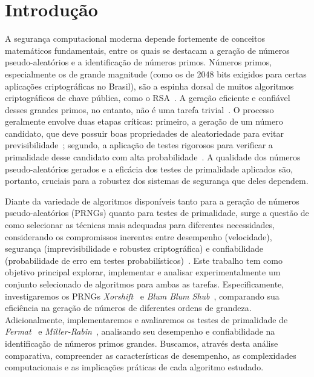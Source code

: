 \chapter{Introdução}

A segurança computacional moderna depende fortemente de conceitos matemáticos fundamentais, entre os quais se destacam a geração de números pseudo-aleatórios e a identificação de números primos. Números primos, especialmente os de grande magnitude (como os de 2048 bits exigidos para certas aplicações criptográficas no Brasil), são a espinha dorsal de muitos algoritmos criptográficos de chave pública, como o RSA~\cite{menezes1996handbook_miller}. A geração eficiente e confiável desses grandes primos, no entanto, não é uma tarefa trivial~\cite{crandall2005prime}. O processo geralmente envolve duas etapas críticas: primeiro, a geração de um número candidato, que deve possuir boas propriedades de aleatoriedade para evitar previsibilidade~\cite{menezes1996handbook}; segundo, a aplicação de testes rigorosos para verificar a primalidade desse candidato com alta probabilidade~\cite{yan2009primality}. A qualidade dos números pseudo-aleatórios gerados e a eficácia dos testes de primalidade aplicados são, portanto, cruciais para a robustez dos sistemas de segurança que deles dependem.

Diante da variedade de algoritmos disponíveis tanto para a geração de números pseudo-aleatórios (PRNGs) quanto para testes de primalidade, surge a questão de como selecionar as técnicas mais adequadas para diferentes necessidades, considerando os compromissos inerentes entre desempenho (velocidade), segurança (imprevisibilidade e robustez criptográfica) e confiabilidade (probabilidade de erro em testes probabilísticos)~\cite{vassilev2016entropy}. Este trabalho tem como objetivo principal explorar, implementar e analisar experimentalmente um conjunto selecionado de algoritmos para ambas as tarefas. Especificamente, investigaremos os PRNGs \textit{Xorshift}~\cite{marsaglia2003xorshift} e \textit{Blum Blum Shub}~\cite{blum1986simple}, comparando sua eficiência na geração de números de diferentes ordens de grandeza. Adicionalmente, implementaremos e avaliaremos os testes de primalidade de \textit{Fermat}~\cite{cohen1993course} e \textit{Miller-Rabin}~\cite{rabin1980probabilistic,miller1976riemann}, analisando seu desempenho e confiabilidade na identificação de números primos grandes. Buscamos, através desta análise comparativa, compreender as características de desempenho, as complexidades computacionais e as implicações práticas de cada algoritmo estudado.

